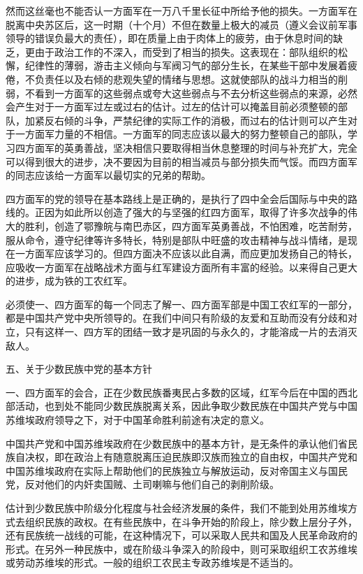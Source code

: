 然而这丝毫也不能否认一方面军在一万八千里长征中所给予他的损失。一方面军在脱离中央苏区后，这一时期（十个月）不但在数量上极大的减员（遵义会议前军事领导的错误负最大的责任），即在质量上由于肉体上的疲劳，由于休息时间的缺乏，更由于政治工作的不深入，而受到了相当的损失。这表现在：部队组织的松懈，纪律性的薄弱，游击主义倾向与军阀习气的部分生长，在某些干部中发展着疲倦，不负责任以及右倾的悲观失望的情绪与思想。这就使部队的战斗力相当的削弱，不看到一方面军的这些弱点或夸大这些弱点与不去分析这些弱点的来源，必然会产生对于一方面军过左或过右的估计。过左的估计可以掩盖目前必须整顿的部队，加紧反右倾的斗争，严禁纪律的实际工作的消极，而过右的估计则可以产生对于一方面军力量的不相信。一方面军的同志应该以最大的努力整顿自己的部队，学习四方面军的英勇善战，坚决相信只要取得相当休息整理的时间与补充扩大，完全可以得到很大的进步，决不要因为目前的相当减员与部分损失而气馁。而四方面军的同志应该给一方面军以最切实的兄弟的帮助。

四方面军的党的领导在基本路线上是正确的，是执行了四中全会后国际与中央的路线的。正因为如此所以创造了强大的与坚强的红四方面军，取得了许多次战争的伟大的胜利，创造了鄂豫皖与南巴赤区，四方面军英勇善战，不怕困难，吃苦耐劳，服从命令，遵守纪律等许多特长，特别是部队中旺盛的攻击精神与战斗情绪，是现在一方面军应该学习的。但四方面决不应该以此自满，而应更加发扬自己的特长，应吸收一方面军在战略战术方面与红军建设方面所有丰富的经验。以来得自己更大的进步，成为铁的工农红军。

必须使一、四方面军的每一个同志了解一、四方面军部是中国工农红军的一部分，都是中国共产党中央所领导的。在我们中间只有阶级的友爱和互助而没有分歧和对立，只有这样一、四方军的团结一致才是巩固的与永久的，才能溶成一片的去消灭敌人。

五、关于少数民族中党的基本方针

一、四方面军的会合，正在少数民族番夷民占多数的区域，红军今后在中国的西北部活动，也到处不能同少数民族脱离关系，因此争取少数民族在中国共产党与中国苏维埃政府领导之下，对于中国革命胜利前途有决定的意义。

中国共产党和中国苏维埃政府在少数民族中的基本方针，是无条件的承认他们省民族自决权，即在政治上有随意脱离压迫民族即汉族而独立的自由权，中国共产党和中国苏维埃政府在实际上帮助他们的民族独立与解放运动，反对帝国主义与国民党，反对他们的内奸卖国贼、土司喇嘛与他们自己的剥削阶级。

估计到少数民族中阶级分化程度与社会经济发展的条件，我们不能到处用苏维埃方式去组织民族的政权。在有些民族中，在斗争开始的阶段上，除少数上层分子外，还有民族统一战线的可能，在这种情况下，可以采取人民共和国及人民革命政府的形式。在另外一种民族中，或在阶级斗争深入的阶段中，则可采取组织工农苏维埃或劳动苏维埃的形式。一般的组织工农民主专政苏维埃是不适当的。

